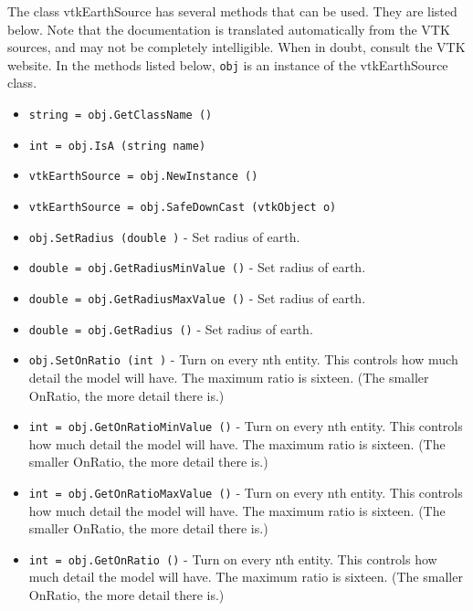 The class vtkEarthSource has several methods that can be used.
  They are listed below.
Note that the documentation is translated automatically from the VTK sources,
and may not be completely intelligible.  When in doubt, consult the VTK website.
In the methods listed below, \verb|obj| is an instance of the vtkEarthSource class.
\begin{itemize}
\item  \verb|string = obj.GetClassName ()|

\item  \verb|int = obj.IsA (string name)|

\item  \verb|vtkEarthSource = obj.NewInstance ()|

\item  \verb|vtkEarthSource = obj.SafeDownCast (vtkObject o)|

\item  \verb|obj.SetRadius (double )| -  Set radius of earth.

\item  \verb|double = obj.GetRadiusMinValue ()| -  Set radius of earth.

\item  \verb|double = obj.GetRadiusMaxValue ()| -  Set radius of earth.

\item  \verb|double = obj.GetRadius ()| -  Set radius of earth.

\item  \verb|obj.SetOnRatio (int )| -  Turn on every nth entity. This controls how much detail the model
 will have. The maximum ratio is sixteen. (The smaller OnRatio, the more
 detail there is.)

\item  \verb|int = obj.GetOnRatioMinValue ()| -  Turn on every nth entity. This controls how much detail the model
 will have. The maximum ratio is sixteen. (The smaller OnRatio, the more
 detail there is.)

\item  \verb|int = obj.GetOnRatioMaxValue ()| -  Turn on every nth entity. This controls how much detail the model
 will have. The maximum ratio is sixteen. (The smaller OnRatio, the more
 detail there is.)

\item  \verb|int = obj.GetOnRatio ()| -  Turn on every nth entity. This controls how much detail the model
 will have. The maximum ratio is sixteen. (The smaller OnRatio, the more
 detail there is.)


\end{itemize}
